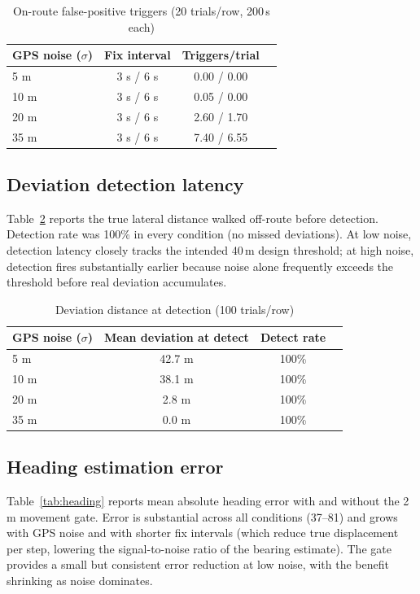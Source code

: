 \documentclass[conference]{IEEEtran}
\begin{document}
\begin{table}[h]
\caption{On-route false-positive triggers (20 trials/row, 200\,s each)}
\label{tab:falsepos}
\centering
\begin{tabular}{@{}lccc@{}}
\toprule
\textbf{GPS noise ($\sigma$)} & \textbf{Fix interval} & \textbf{Triggers/trial} \\
\midrule
5 m & 3 s / 6 s & 0.00 / 0.00 \\
10 m & 3 s / 6 s & 0.05 / 0.00 \\
20 m & 3 s / 6 s & 2.60 / 1.70 \\
35 m & 3 s / 6 s & 7.40 / 6.55 \\
\bottomrule
\end{tabular}
\end{table}

\subsection{Deviation detection latency}
Table~\ref{tab:latency} reports the true lateral distance walked off-route before detection. Detection rate was 100\% in every condition (no missed deviations). At low noise, detection latency closely tracks the intended 40\,m design threshold; at high noise, detection fires substantially earlier because noise alone frequently exceeds the threshold before real deviation accumulates.

\begin{table}[h]
\caption{Deviation distance at detection (100 trials/row)}
\label{tab:latency}
\centering
\begin{tabular}{@{}lccc@{}}
\toprule
\textbf{GPS noise ($\sigma$)} & \textbf{Mean deviation at detect} & \textbf{Detect rate} \\
\midrule
5 m & 42.7 m & 100\% \\
10 m & 38.1 m & 100\% \\
20 m & 2.8 m & 100\% \\
35 m & 0.0 m & 100\% \\
\bottomrule
\end{tabular}
\end{table}

\subsection{Heading estimation error}
Table~\ref{tab:heading} reports mean absolute heading error with and without the 2\,m movement gate. Error is substantial across all conditions (37--81\textdegree) and grows with GPS noise and with shorter fix intervals (which reduce true displacement per step, lowering the signal-to-noise ratio of the bearing estimate). The gate provides a small but consistent error reduction at low noise, with the benefit shrinking as noise dominates.
\end{document}
